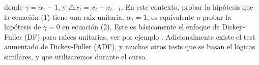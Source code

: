 donde $\gamma=\alpha_1-1$, y $\triangle x_t = x_t - x_{t-1}$. En este contexto, probar la hip\'otesis que la ecuaci\'on (1) tiene una ra\'{\i}z unitaria, $\alpha_1 = 1$, es equivalente a probar la hip\'otesis de $\gamma=0$ en ecuaci\'on (2). 
Este es b\'asicamente el enfoque de Dickey-Fuller (DF) para ra\'{\i}ces unitarias, ver por ejemplo \cite{dickey1981likelihood}. Adicionalmente existe el test aumentado de Dickey-Fuller (ADF), y muchos otros tests que se basan el l\'ogicas similares, y que utilizaremos durante el curso.


